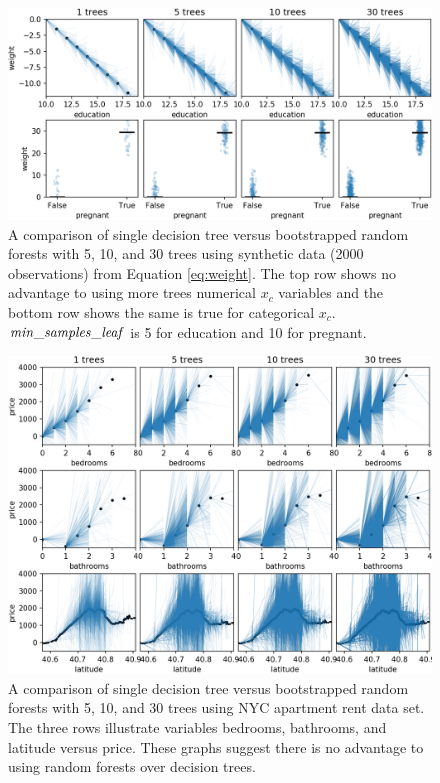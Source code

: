 \documentclass[12pt]{article}
\begin{document}
\begin{figure}[htbp]
\begin{center}
\includegraphics[scale=0.55]{images/education_pregnant_vs_weight_ntrees.png}
\caption{A comparison of single decision tree versus bootstrapped random forests with 5, 10, and 30 trees using synthetic data (2000 observations) from Equation \eqref{eq:weight}. The top row shows no advantage to using more trees numerical $x_c$ variables and the bottom row shows the same is true for categorical $x_c$. ${\it min\_samples\_leaf}$ is 5 for education and 10 for pregnant.}
\label{fig:weight_ntrees}
\end{center}
\end{figure}

\begin{figure}[htbp]
\begin{center}
\includegraphics[scale=0.55]{images/rent_ntrees.png}
\caption{A comparison of single decision tree versus bootstrapped random forests with 5, 10, and 30 trees using NYC apartment rent data set. The three rows illustrate variables bedrooms, bathrooms, and latitude versus price. These graphs suggest there is no advantage to using random forests over decision trees.}
\label{fig:rent_ntrees}
\end{center}
\end{figure}
\end{document}
